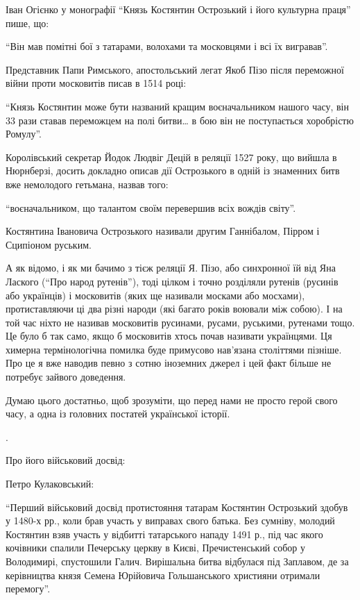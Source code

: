 Іван Огієнко у монографії \enquote{Князь Костянтин Острозький і його культурна праця}
пише, що: 

\enquote{Він мав помітні бої з татарами, волохами та московцями і всі їх вигравав}.

Представник Папи Римського, апостольський легат Якоб Пізо після переможної
війни проти московитів писав в 1514 році: 

\enquote{Князь Костянтин може бути названий кращим воєначальником нашого часу, він 33
рази ставав переможцем на полі битви… в бою він не поступається хоробрістю
Ромулу}. 

Королівський секретар Йодок Людвіг Децій в реляції 1527 року, що вийшла в
Нюрнберзі, досить докладно описав дії Острозького в одній із знаменних битв вже
немолодого гетьмана, назвав того:

\enquote{воєначальником, що талантом своїм перевершив всіх вождів світу}.

Костянтина Івановича Острозького називали другим Ганнібалом, Пірром і Сципіоном
руським. 

А як відомо, і як ми бачимо з тієж реляції Я. Пізо, або синхронної їй від Яна
Лаского (\enquote{Про народ рутенів}), тоді цілком і точно розділяли рутенів (русинів
або українців) і московитів (яких ще називали москами або мосхами),
протиставляючи ці два різні народи (які багато років воювали між собою). І на
той час ніхто не називав московитів русинами, русами, руськими, рутенами тощо.
Це було б так само, якщо б московитів хтось почав називати українцями. Ця
химерна термінологічна помилка буде примусово нав’язана століттями пізніше. Про
це я вже наводив певно з сотню іноземних джерел і цей факт більше не потребує
зайвого доведення.

Думаю цього достатньо, щоб зрозуміти, що перед нами не просто герой свого часу,
а одна із головних постатей української історії.

.

Про його військовий досвід:

Петро Кулаковський:

\enquote{Перший військовий досвід протистояння татарам Костянтин Острозький здобув у
1480-х рр., коли брав участь у виправах свого батька. Без сумніву, молодий
Костянтин взяв участь у відбитті татарського нападу 1491 р., під час якого
кочівники спалили Печерську церкву в Києві, Пречистенський собор у Володимирі,
спустошили Галич. Вирішальна битва відбулася під Заплавом, де за керівництва
князя Семена Юрійовича Гольшанського християни отримали перемогу}.

